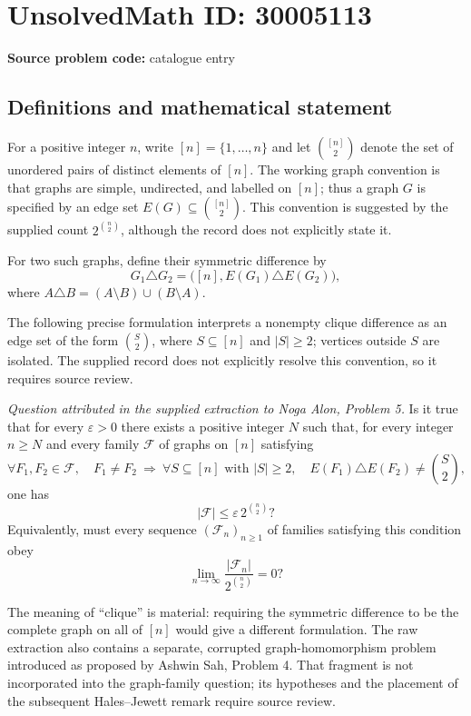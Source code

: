 \documentclass[11pt]{article}
\begin{document}
\section*{UnsolvedMath ID: 30005113}
\textbf{Source problem code:} catalogue entry
\subsection{Definitions and mathematical statement}
For a positive integer \(n\), write \([n]=\{1,\ldots,n\}\) and let \(\binom{[n]}2\) denote the set of unordered pairs of distinct elements of \([n]\). The working graph convention is that graphs are simple, undirected, and labelled on \([n]\); thus a graph \(G\) is specified by an edge set \(E(G)\subseteq\binom{[n]}2\). This convention is suggested by the supplied count \(2^{\binom n2}\), although the record does not explicitly state it.

For two such graphs, define their symmetric difference by
\[
G_1\triangle G_2=\bigl([n],E(G_1)\triangle E(G_2)\bigr),
\]
where \(A\triangle B=(A\setminus B)\cup(B\setminus A)\).

The following precise formulation interprets a nonempty clique difference as an edge set of the form \(\binom S2\), where \(S\subseteq[n]\) and \(|S|\ge2\); vertices outside \(S\) are isolated. The supplied record does not explicitly resolve this convention, so it requires source review.

\emph{Question attributed in the supplied extraction to Noga Alon, Problem 5.} Is it true that for every \(\varepsilon>0\) there exists a positive integer \(N\) such that, for every integer \(n\ge N\) and every family \(\mathcal F\) of graphs on \([n]\) satisfying
\[
\forall F_1,F_2\in\mathcal F,\quad F_1\ne F_2
\ \Longrightarrow\ 
\forall S\subseteq[n]\text{ with }|S|\ge2,\quad
E(F_1)\triangle E(F_2)\ne\binom S2,
\]
one has
\[
|\mathcal F|\le\varepsilon\,2^{\binom n2}?
\]
Equivalently, must every sequence \((\mathcal F_n)_{n\ge1}\) of families satisfying this condition obey
\[
\lim_{n\to\infty}\frac{|\mathcal F_n|}{2^{\binom n2}}=0?
\]

The meaning of ``clique'' is material: requiring the symmetric difference to be the complete graph on all of \([n]\) would give a different formulation. The raw extraction also contains a separate, corrupted graph-homomorphism problem introduced as proposed by Ashwin Sah, Problem 4. That fragment is not incorporated into the graph-family question; its hypotheses and the placement of the subsequent Hales--Jewett remark require source review.
\end{document}
